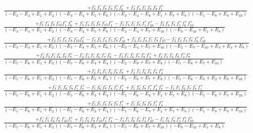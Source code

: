 \documentclass{article}
\begin{document}
\[\begin{array}{rcl}
\frac{+f_{3}^{-}f_{4}^{-}f_{8}^{-}f_{9}^{-}f_{1}^{+}f_{6}^{+}+f_{3}^{-}f_{4}^{-}f_{5}^{-}f_{8}^{-}f_{9}^{-}f_{1}^{+}}{(-E_{3}-E_{4}+E_{1}+E_{2})(-E_{3}-E_{4}+E_{5}+E_{6})(-E_{3}-E_{4}-E_{9}+E_{1}+E_{7}+E_{8})(-E_{1}-E_{8}+E_{9}+E_{10})}\\
\frac{+f_{3}^{-}f_{4}^{-}f_{9}^{-}f_{10}^{-}f_{1}^{+}f_{6}^{+}+f_{3}^{-}f_{4}^{-}f_{5}^{-}f_{9}^{-}f_{10}^{-}f_{1}^{+}-f_{3}^{-}f_{4}^{-}f_{5}^{-}f_{8}^{-}f_{1}^{+}f_{10}^{+}-f_{3}^{-}f_{4}^{-}f_{8}^{-}f_{1}^{+}f_{6}^{+}f_{10}^{+}}{(-E_{3}-E_{4}+E_{1}+E_{2})(-E_{3}-E_{4}+E_{5}+E_{6})(-E_{3}-E_{4}+E_{7}+E_{10})(-E_{9}-E_{10}+E_{1}+E_{8})}\\
\frac{+f_{2}^{-}f_{3}^{-}f_{4}^{-}f_{9}^{-}f_{10}^{-}f_{6}^{+}-f_{2}^{-}f_{3}^{-}f_{4}^{-}f_{5}^{-}f_{8}^{-}f_{10}^{+}+f_{2}^{-}f_{3}^{-}f_{4}^{-}f_{5}^{-}f_{9}^{-}f_{10}^{-}-f_{2}^{-}f_{3}^{-}f_{4}^{-}f_{8}^{-}f_{6}^{+}f_{10}^{+}}{(-E_{3}-E_{4}+E_{1}+E_{2})(-E_{3}-E_{4}+E_{5}+E_{6})(-E_{3}-E_{4}+E_{7}+E_{10})(-E_{2}-E_{9}-E_{10}+E_{3}+E_{4}+E_{8})}\\
\frac{+f_{2}^{-}f_{3}^{-}f_{5}^{-}f_{6}^{-}f_{9}^{-}f_{7}^{+}-f_{2}^{-}f_{3}^{-}f_{5}^{-}f_{6}^{-}f_{7}^{-}f_{8}^{-}-f_{2}^{-}f_{5}^{-}f_{6}^{-}f_{7}^{-}f_{8}^{-}f_{4}^{+}+f_{2}^{-}f_{5}^{-}f_{6}^{-}f_{9}^{-}f_{4}^{+}f_{7}^{+}}{(-E_{5}-E_{6}+E_{1}+E_{2})(-E_{5}-E_{6}+E_{3}+E_{4})(-E_{2}-E_{9}+E_{7}+E_{8})(-E_{5}-E_{6}+E_{7}+E_{10})}\\
\frac{+f_{2}^{-}f_{3}^{-}f_{5}^{-}f_{6}^{-}f_{8}^{-}f_{9}^{-}+f_{2}^{-}f_{5}^{-}f_{6}^{-}f_{8}^{-}f_{9}^{-}f_{4}^{+}}{(-E_{5}-E_{6}+E_{1}+E_{2})(-E_{5}-E_{6}+E_{3}+E_{4})(-E_{2}-E_{9}+E_{7}+E_{8})(-E_{5}-E_{6}-E_{8}+E_{2}+E_{9}+E_{10})}\\
\frac{+f_{3}^{-}f_{5}^{-}f_{6}^{-}f_{9}^{-}f_{1}^{+}f_{7}^{+}-f_{5}^{-}f_{6}^{-}f_{7}^{-}f_{8}^{-}f_{1}^{+}f_{4}^{+}+f_{5}^{-}f_{6}^{-}f_{9}^{-}f_{1}^{+}f_{4}^{+}f_{7}^{+}-f_{3}^{-}f_{5}^{-}f_{6}^{-}f_{7}^{-}f_{8}^{-}f_{1}^{+}}{(-E_{5}-E_{6}+E_{1}+E_{2})(-E_{5}-E_{6}+E_{3}+E_{4})(-E_{5}-E_{6}-E_{9}+E_{1}+E_{7}+E_{8})(-E_{5}-E_{6}+E_{7}+E_{10})}\\
\frac{+f_{3}^{-}f_{5}^{-}f_{6}^{-}f_{8}^{-}f_{9}^{-}f_{1}^{+}+f_{5}^{-}f_{6}^{-}f_{8}^{-}f_{9}^{-}f_{1}^{+}f_{4}^{+}}{(-E_{5}-E_{6}+E_{1}+E_{2})(-E_{5}-E_{6}+E_{3}+E_{4})(-E_{5}-E_{6}-E_{9}+E_{1}+E_{7}+E_{8})(-E_{1}-E_{8}+E_{9}+E_{10})}\\
\frac{+f_{3}^{-}f_{5}^{-}f_{6}^{-}f_{9}^{-}f_{10}^{-}f_{1}^{+}+f_{5}^{-}f_{6}^{-}f_{9}^{-}f_{10}^{-}f_{1}^{+}f_{4}^{+}-f_{3}^{-}f_{5}^{-}f_{6}^{-}f_{8}^{-}f_{1}^{+}f_{10}^{+}-f_{5}^{-}f_{6}^{-}f_{8}^{-}f_{1}^{+}f_{4}^{+}f_{10}^{+}}{(-E_{5}-E_{6}+E_{1}+E_{2})(-E_{5}-E_{6}+E_{3}+E_{4})(-E_{5}-E_{6}+E_{7}+E_{10})(-E_{9}-E_{10}+E_{1}+E_{8})}\\

\end{array}\]
\end{document}
